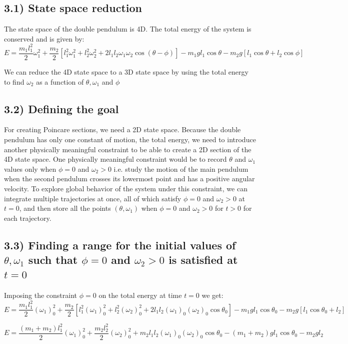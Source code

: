 \documentclass[12pt]{article}
\begin{document}
\subsection*{3.1) State space reduction}

The state space of the double pendulum is 4D. The total energy of the system is conserved and is given by:
\[
E=\frac{m_1l_1^2}{2}\omega_1^2
+\frac{m_2}{2}\left[
l_1^2\omega_1^2+l_2^2\omega_2^2
+2l_1l_2\omega_1\omega_2\cos(\theta-\phi)
\right]
-m_1gl_1\cos\theta
-m_2g[l_1\cos\theta+l_2\cos\phi]
\]

We can reduce the 4D state space to a 3D state space by using the total energy to find $\omega_2$ as a function of $\theta,\omega_1$ and $\phi$

\subsection*{3.2) Defining the goal}

For creating Poincare sections, we need a 2D state space. Because the double pendulum has only one constant of motion, the total energy, we need to introduce another physically meaningful constraint to be able to create a 2D section of the 4D state space. One physically meaningful constraint would be to record $\theta$ and $\omega_1$ values only when $\phi=0$ and $\omega_2>0$ i.e. study the motion of the main pendulum when the second pendulum crosses its lowermost point and has a positive angular velocity. To explore global behavior of the system under this constraint, we can integrate multiple trajectories at once, all of which satisfy $\phi=0$ and $\omega_2>0$ at $t=0$, and then store all the points $(\theta,\omega_1)$ when $\phi=0$ and $\omega_2>0$ for $t>0$ for each trajectory.

\subsection*{3.3) Finding a range for the initial values of \ensuremath{\theta,\omega_1} such that \ensuremath{\phi=0} and \ensuremath{\omega_2>0} is satisfied at \ensuremath{t=0}}

Imposing the constraint $\phi=0$ on the total energy at time $t=0$ we get:
\[
E=\frac{m_1l_1^2}{2}(\omega_1)_0^2
+\frac{m_2}{2}\left[
l_1^2(\omega_1)_0^2+l_2^2(\omega_2)_0^2
+2l_1l_2(\omega_1)_0(\omega_2)_0\cos\theta_0
\right]
-m_1gl_1\cos\theta_0
-m_2g[l_1\cos\theta_0+l_2]
\]

\[
E=\frac{(m_1+m_2)l_1^2}{2}(\omega_1)_0^2
+\frac{m_2l_2^2}{2}(\omega_2)_0^2
+m_2l_1l_2(\omega_1)_0(\omega_2)_0\cos\theta_0
-(m_1+m_2)gl_1\cos\theta_0-m_2gl_2
\]
\end{document}
